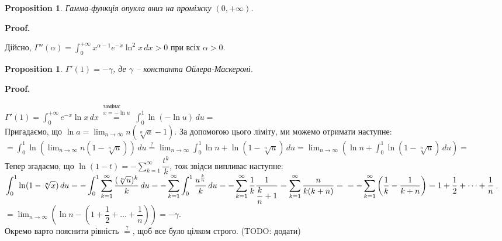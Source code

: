 \documentclass[a4paper, 10pt]{article}
\makeatletter
\theoremstyle{theoremdd}
\theoremstyle{theoremdd}
\theoremstyle{theoremdd}
\theoremstyle{theoremdd}
\theoremstyle{theoremdd}
\theoremstyle{theoremdd}
\newtheorem{proposition}[theorem]{Proposition}
\theoremstyle{theoremdd}
\theoremstyle{theoremdd}
\theoremstyle{theoremdd}
\renewenvironment{proof}[1][Proof.\\]{\par
\pushQED{\hfill \qed}%
\normalfont \topsep6\p@\@plus6\p@\relax
\trivlist
\item\relax
{\bfseries
#1\@addpunct{.}}\hspace\labelsep\ignorespaces
}{%
\popQED\endtrivlist\@endpefalse
}
\makeatother
\begin{document}
\begin{proposition}
Гамма-функція опукла вниз на проміжку $(0,+\infty)$.
\end{proposition}

\begin{proof}
Дійсно, $\Gamma''(\alpha) = \displaystyle\int_0^{+\infty} x^{\alpha-1} e^{-x} \ln^2 x\,dx > 0$ при всіх $\alpha > 0$.
\end{proof}

\begin{proposition}
$\Gamma'(1) = -\gamma$, де $\gamma$ -- константа Ойлера-Маскероні.
\end{proposition}

\begin{proof}
$\Gamma'(1) = \displaystyle\int_0^{+\infty} e^{-x} \ln x\,dx \overset{\substack{\text{заміна:} \\ x = -\ln u}}{=} \int_0^1 \ln (-\ln u)\,du \boxed{=}$\\
Пригадаємо, що $\ln a = \displaystyle\lim_{n \to \infty} n (\sqrt[n]{a}-1)$. За допомогою цього ліміту, ми можемо отримати наступне:\\
$\boxed{=} \displaystyle \int_0^1 \ln \left( \lim_{n \to \infty} n(1-\sqrt[n]{u})\right)\,du \overset{?}{=} \lim_{n \to \infty} \int_0^1 \ln n + \ln(1-\sqrt[n]{u})\,du = \lim_{n \to \infty} \left( \ln n + \int_0^1 \ln(1-\sqrt[n]{u})\,du \right) \boxed{=}$\\
Тепер згадаємо, що $\ln(1-t) = -\displaystyle\sum_{k=1}^\infty \dfrac{t^k}{k}$, тож звідси випливає наступне:\\
$\displaystyle\int_0^1 \ln (1-\sqrt[n]{x})\,du = -\int_0^1 \sum_{k=1}^\infty \dfrac{(\sqrt[n]{u})^k}{k}\,du = -\sum_{k=1}^\infty \int_0^1 \dfrac{u^{\frac{k}{n}}}{k}\,du = -\sum_{k=1}^\infty \dfrac{1}{k} \dfrac{1}{\dfrac{k}{n}+1} = \sum_{k=1}^\infty \dfrac{n}{k(k+n)} = \\ = -\sum_{k=1}^\infty \left( \dfrac{1}{k} - \dfrac{1}{k+n} \right) = 1 + \dfrac{1}{2} + \dots + \dfrac{1}{n}$.\\
$\boxed{=} \displaystyle\lim_{n \to \infty} \left( \ln n - \left( 1 + \dfrac{1}{2} + \dots + \dfrac{1}{n} \right) \right) = -\gamma$.
\bigskip \\
Окремо варто пояснити рівність $\overset{?}{=}$, щоб все було цілком строго. (TODO: додати)

\end{proof}
\end{document}
